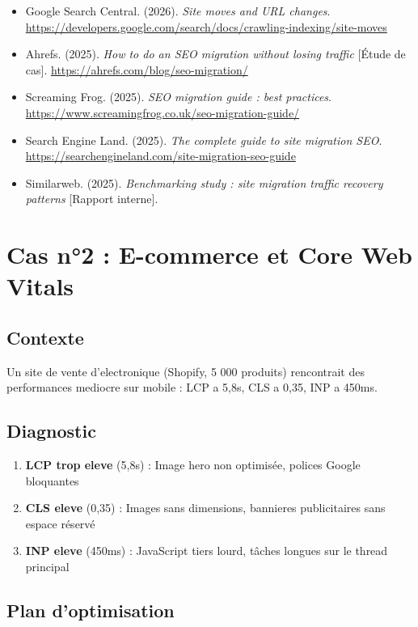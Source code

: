 \documentclass[12pt,a4paper,twoside]{report}
\begin{document}
\begin{itemize}
    \item Google Search Central. (2026). \textit{Site moves and URL changes}. \url{https://developers.google.com/search/docs/crawling-indexing/site-moves}
    \item Ahrefs. (2025). \textit{How to do an SEO migration without losing traffic} [Étude de cas]. \url{https://ahrefs.com/blog/seo-migration/}
    \item Screaming Frog. (2025). \textit{SEO migration guide : best practices}. \url{https://www.screamingfrog.co.uk/seo-migration-guide/}
    \item Search Engine Land. (2025). \textit{The complete guide to site migration SEO}. \url{https://searchengineland.com/site-migration-seo-guide}
    \item Similarweb. (2025). \textit{Benchmarking study : site migration traffic recovery patterns} [Rapport interne].
\end{itemize}

\section{Cas n°2 : E-commerce et Core Web Vitals}

\subsection{Contexte}

Un site de vente d'electronique (Shopify, 5 000 produits) rencontrait des performances mediocre sur mobile : LCP a 5,8s, CLS a 0,35, INP a 450ms.

\subsection{Diagnostic}

\begin{enumerate}
    \item \textbf{LCP trop eleve} (5,8s) : Image hero non optimisée, polices Google bloquantes
    \item \textbf{CLS eleve} (0,35) : Images sans dimensions, bannieres publicitaires sans espace réservé
    \item \textbf{INP eleve} (450ms) : JavaScript tiers lourd, tâches longues sur le thread principal
\end{enumerate}

\subsection{Plan d'optimisation}
\end{document}
